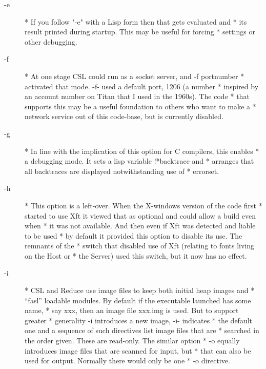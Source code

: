 \documentclass[a4paper,11pt]{article}
\begin{document}
\begin{description}
\item [{\ttfamily -e}] 
          * If you follow "-e" with a Lisp form then that gets evaluated and
          * its result printed during startup. This may be useful for forcing
          * settings or other debugging.

\item [{\ttfamily -f}] 
          * At one stage CSL could run as a socket server, and {\ttfamily -f portnumber}
          * activated that mode. {\ttfamily -f-} used a default port, 1206 (a number
          * inspired by an account number on Titan that I used in the 1960s). The code
          * that supports this may be a useful foundation to others who want to make a
          * network service out of this code-base, but is currently disabled.

\item [{\ttfamily -g}] 
          * In line with the implication of this option for C compilers, this enables
          * a debugging mode. It sets a lisp variable {\ttfamily !*backtrace} and
          * arranges that all backtraces are displayed notwithstanding use of
          * {\ttfamily errorset}.

\item [{\ttfamily -h}] 
          * This option is a left-over. When the X-windows version of the code first
          * started to use Xft it viewed that as optional and could allow a build even when
          * it was not available. And then even if Xft was detected and liable to be used
          * by default it provided this option to disable its use. The remnants of the
          * switch that disabled use of Xft (relating to fonts living on the Host or
          * the Server) used this switch, but it now has no effect.

\item [{\ttfamily -i}] 
          * CSL and Reduce use image files to keep both initial heap images and
          * ``fasl'' loadable modules. By default if the executable launched has some name,
          * say xxx, then an image file xxx.img is used. But to support greater
          * generality {\ttfamily -i} introduces a new image, {\ttfamily -i-} indicates
          * the default one and a sequence of such directives list image files that are
          * searched in the order given. These are read-only. The similar option
          * {\ttfamily -o} equally introduces image files that are scanned for input, but
          * that can also be used for output. Normally there would only be one
          * {\ttfamily -o} directive.


\end{description}
\end{document}
